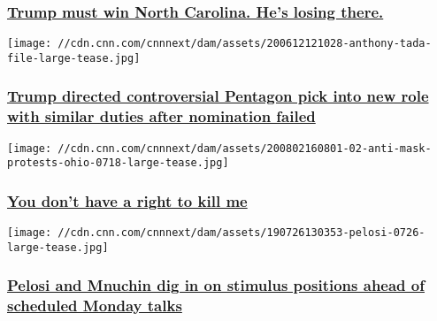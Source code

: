 \hypertarget{trump-must-win-north-carolina-hes-losing-there}{%
\subsubsection{\texorpdfstring{\href{/2020/08/02/politics/trump-trails-north-carolina/index.html}{Trump
must win North Carolina. He's losing
there.}}{Trump must win North Carolina. He's losing there.}}\label{trump-must-win-north-carolina-hes-losing-there}}

\href{/2020/08/02/politics/anthony-tata-nominee-pentagon/index.html}{}

\texttt{[image: //cdn.cnn.com/cnnnext/dam/assets/200612121028-anthony-tada-file-large-tease.jpg]}

\hypertarget{trump-directed-controversial-pentagon-pick-into-new-role-with-similar-duties-after-nomination-failed}{%
\subsubsection{\texorpdfstring{\href{/2020/08/02/politics/anthony-tata-nominee-pentagon/index.html}{Trump
directed controversial Pentagon pick into new role with similar duties
after nomination
failed}}{Trump directed controversial Pentagon pick into new role with similar duties after nomination failed}}\label{trump-directed-controversial-pentagon-pick-into-new-role-with-similar-duties-after-nomination-failed}}

\href{/2020/08/02/opinions/masks-whining-protesters-trump-obeidallah/index.html}{}

\texttt{[image: //cdn.cnn.com/cnnnext/dam/assets/200802160801-02-anti-mask-protests-ohio-0718-large-tease.jpg]}

\hypertarget{you-dont-have-a-right-to-kill-me}{%
\subsubsection{\texorpdfstring{\href{/2020/08/02/opinions/masks-whining-protesters-trump-obeidallah/index.html}{You
don't have a right to kill
me}}{You don't have a right to kill me}}\label{you-dont-have-a-right-to-kill-me}}

\href{/2020/08/02/politics/stimulus-negotiations-pelosi-mnuchin-coronavirus/index.html}{}

\texttt{[image: //cdn.cnn.com/cnnnext/dam/assets/190726130353-pelosi-0726-large-tease.jpg]}

\hypertarget{pelosi-and-mnuchin-dig-in-on-stimulus-positions-ahead-of-scheduled-monday-talks}{%
\subsubsection{\texorpdfstring{\href{/2020/08/02/politics/stimulus-negotiations-pelosi-mnuchin-coronavirus/index.html}{Pelosi
and Mnuchin dig in on stimulus positions ahead of scheduled Monday
talks}}{Pelosi and Mnuchin dig in on stimulus positions ahead of scheduled Monday talks}}\label{pelosi-and-mnuchin-dig-in-on-stimulus-positions-ahead-of-scheduled-monday-talks}}

